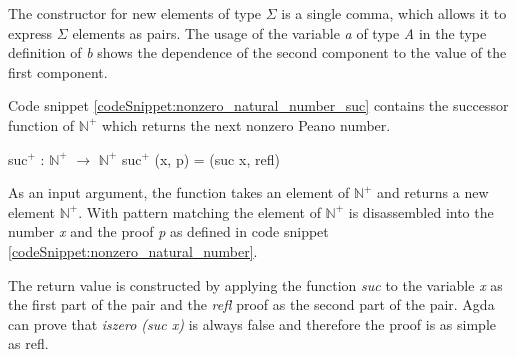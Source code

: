 The constructor for new elements of type $\Sigma$ is a single comma, which allows it to express $\Sigma$ elements as pairs.
The usage of the variable \emph{a} of type \emph{A} in the type definition of \emph{b} shows the dependence of the second component to the value of the first component.

Code snippet \ref{codeSnippet:nonzero_natural_number_suc} contains the successor function of $\mathbb{N}^+$ which returns the next nonzero Peano number.
\begin{codesnippet}[mathescape=true, caption={Successor of $\mathbb{N}^+$}, label={codeSnippet:nonzero_natural_number_suc}]
suc$^+$ : $\mathbb{N}^+$ $\rightarrow$ $\mathbb{N}^+$
suc$^+$ (x, p) = (suc x, refl)
\end{codesnippet}

As an input argument, the function takes an element of $\mathbb{N}^+$ and returns a new element $\mathbb{N}^+$. 
With pattern matching the element of $\mathbb{N}^+$ is disassembled into the number \emph{x} and the proof \emph{p} as defined in code snippet \ref{codeSnippet:nonzero_natural_number}.

The return value is constructed by applying the function \emph{suc} to the variable \emph{x} as the first part of the pair and the \emph{refl} proof as the second part of the pair.
Agda can prove that \emph{iszero (suc x)} is always false and therefore the proof is as simple as refl.
